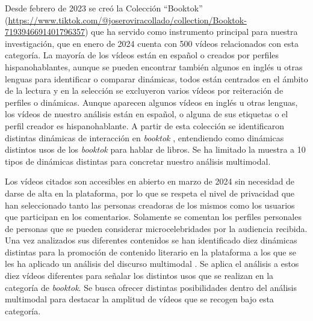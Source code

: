 Desde febrero de 2023 se creó la Colección ``Booktok''
(\url{https://www.tiktok.com/@joseroviracollado/collection/Booktok-7193946691401796357})
que ha servido como instrumento principal para nuestra investigación,
que en enero de 2024 cuenta con 500 vídeos relacionados con esta
categoría. La mayoría de los vídeos están en español o creados por
perfiles hispanohablantes, aunque se pueden encontrar también algunos en
inglés u otras lenguas para identificar o comparar dinámicas, todos
están centrados en el ámbito de la lectura y en la selección se
excluyeron varios vídeos por reiteración de perfiles o dinámicas. Aunque
aparecen algunos vídeos en inglés u otras lenguas, los vídeos de nuestro
análisis están en español, o alguna de sus etiquetas o el perfil creador
es hispanohablante. A partir de esta colección se identificaron
distintas dinámicas de interacción en \emph{booktok} \cite{roviracollado2022}, entendiendo como dinámicas distintos usos de los
\emph{booktok} para hablar de libros. Se ha limitado la muestra a 10
tipos de dinámicas distintas para concretar nuestro análisis multimodal.

Los vídeos citados son accesibles en abierto en marzo de 2024 sin
necesidad de darse de alta en la plataforma, por lo que se respeta el
nivel de privacidad que han seleccionado tanto las personas creadoras de
los mismos como los usuarios que participan en los comentarios.
Solamente se comentan los perfiles personales de personas que se pueden
considerar microcelebridades por la audiencia recibida. Una vez
analizados sus diferentes contenidos se han identificado diez dinámicas
distintas  para la promoción de contenido literario en la
plataforma a los que se les ha aplicado un análisis del discurso
multimodal \cite{kress2001}. Se aplica el análisis a estos
diez vídeos diferentes para señalar los distintos usos que se realizan
en la categoría de \emph{booktok}. Se busca ofrecer distintas
posibilidades dentro del análisis multimodal para destacar la amplitud
de vídeos que se recogen bajo esta categoría.


